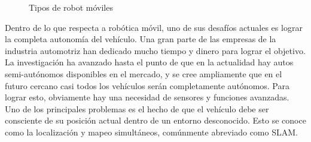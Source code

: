 \begin{figure}%
    \centering
    \qquad
    \qquad
    \qquad
    \qquad
    \caption{Tipos de robot móviles}
    \label{fig:mobilerobots}
\end{figure}

Dentro de lo que respecta a robótica móvil, uno de sus desafíos actuales es lograr la completa autonomía del vehículo. Una gran parte de las empresas de la industria automotriz han dedicado mucho tiempo y dinero para lograr el objetivo. La investigación ha avanzado hasta el punto de que en la actualidad hay autos semi-autónomos disponibles en el mercado, y se cree ampliamente que en el futuro cercano casi todos los vehículos serán completamente autónomos. Para lograr esto, obviamente hay una necesidad de sensores y funciones avanzadas. Uno de los principales problemas es el hecho de que el vehículo debe ser consciente de su posición actual dentro de un entorno desconocido. Esto se conoce como la localización y mapeo simultáneos, comúnmente abreviado como SLAM.

